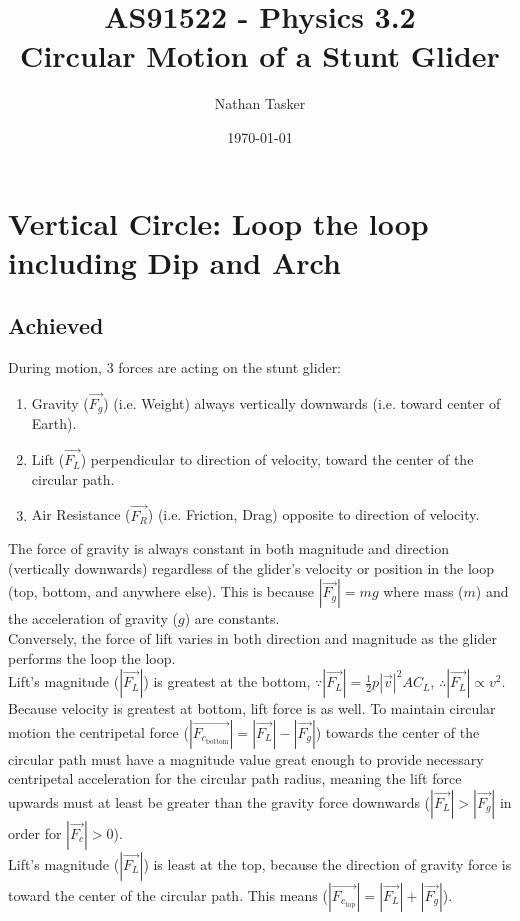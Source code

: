 \documentclass[11pt, a4paper]{article}
\title{\small AS91522 - Physics 3.2\\ \huge Circular Motion of a Stunt Glider}
\author{Nathan Tasker}
\date{\today}
\def\ParagraphSpacing{30pt}
\begin{document}
	\maketitle
	\tableofcontents
	\newpage
	\section{Vertical Circle: Loop the loop including Dip and Arch}
	\subsection{Achieved}
	During motion, 3 forces are acting on the stunt glider:
	\begin{enumerate}
		\item Gravity ($\vec{F_g}$) (i.e. Weight) always vertically downwards (i.e. toward center of Earth).
		\item Lift ($\vec{F_L}$) perpendicular to direction of velocity, toward the center of the circular path.
		\item Air Resistance ($\vec{F_R}$) (i.e. Friction, Drag) opposite to direction of velocity.
	\end{enumerate}
	\vspace{\ParagraphSpacing}
	The force of gravity is always constant in both magnitude and direction (vertically downwards) regardless of the glider's velocity or position in the loop (top, bottom, and anywhere else). This is because $|\vec{F_g}|=mg$ where mass ($m$) and the acceleration of gravity ($g$) are constants.\\[\ParagraphSpacing]
	Conversely, the force of lift varies in both direction and magnitude as the glider performs the loop the loop.\\
	Lift's magnitude ($|\vec{F_L}|$) is greatest at the bottom, $\because |\vec{F_L}|=\frac{1}{2}p|\vec{v}|^2AC_L$, $\therefore |\vec{F_L}|\propto v^2$. Because velocity is greatest at bottom, lift force is as well. To maintain circular motion the centripetal force ($|\vec{F_{c_\text{bottom}}}|=|\vec{F_L}|-|\vec{F_g}|$) towards the center of the circular path must have a magnitude value great enough to provide necessary centripetal acceleration for the circular path radius, meaning the lift force upwards must at least be greater than the gravity force downwards ($|\vec{F_L}|>|\vec{F_g}|$ in order for $|\vec{F_c}|>0$).\\
	Lift's magnitude ($|\vec{F_L}|$) is least at the top, because the direction of gravity force is toward the center of the circular path. This means ($|\vec{F_{c_\text{top}}}|=|\vec{F_L}|+|\vec{F_g}|$).\\
\end{document}
